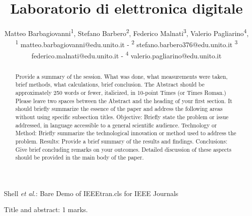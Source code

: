 \documentclass[journal]{IEEEtran}
\begin{document}
\title{Laboratorio di elettronica digitale\\ 
}

\author{\begin{center}Matteo Barbagiovanni\textsuperscript{1},
        Stefano Barbero\textsuperscript{2},
        Federico Malnati\textsuperscript{3},
        Valerio Pagliarino\textsuperscript{4},
        {\small \\
        \textsuperscript{1}
        matteo.barbagiovanni@edu.unito.it -
        \textsuperscript{2}
        stefano.barbero376@edu.unito.it
        \textsuperscript{3}
        federico.malnati@edu.unito.it -
        \textsuperscript{4}
        valerio.pagliarino@edu.unito.it}
        \end{center}}%
        
{Shell \MakeLowercase{\textit{et al.}}: Bare Demo of IEEEtran.cls for IEEE Journals}

\maketitle

\begin{flushright} Title and abstract: 1 marks. \end{flushright}
\begin{abstract} Provide a summary of the session. What was done, 
what measurements were taken, brief methods, what calculations, brief conclusion.  The Abstract should be approximately 250 words or fewer, italicized, in 10-point Times (or Times Roman.) Please leave two spaces between the Abstract and the heading of your first section.
It should briefly summarize the essence of the paper and address the following areas without using specific subsection titles. Objective: Briefly state the problem or issue addressed, in language accessible to a general scientific audience. Technology or Method: Briefly summarize the technological innovation or method used to address the problem. Results: Provide a brief summary of the results and findings. Conclusions: Give brief concluding remarks on your outcomes. Detailed discussion of these aspects should be provided in the main body of the paper. 
\end{abstract}
\end{document}

